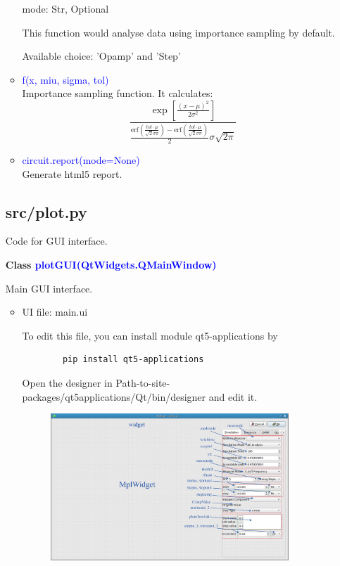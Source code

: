 \documentclass[12pt,a4paper]{article}
\begin{document}
\begin{itemize}[leftmargin=*]
\begin{itemize}
        mode: Str, Optional\par
        \quad This function would analyse data using importance sampling by default.

        \quad Available choice: 'Opamp' and 'Step'

    \item \textcolor{blue}{f(x, miu, sigma, tol)}\\
        Importance sampling function. It calculates:
        \begin{equation*}
            \frac{\exp\left [\frac{(x-\mu)^2}{2\sigma^2}\right ]}{\frac{\text{erf}(\frac{tol\cdot\mu}{\sqrt{2}\sigma\pi})-\text{erf}(\frac{tol\cdot\mu}{\sqrt{2}\sigma\pi})}{2}\sigma\sqrt{2\pi}}
        \end{equation*}

    \item \textcolor{blue}{circuit.report(mode=None)}\\
        Generate html5 report.
\end{itemize}

\subsection{src/plot.py}
Code for GUI interface.

\textbf{Class \textcolor{blue}{plotGUI(QtWidgets.QMainWindow)}}

Main GUI interface.

\begin{itemize}
    \item UI file: main.ui\par
        To edit this file, you can install module qt5-applications by
        \begin{lstlisting}
        pip install qt5-applications
        \end{lstlisting}

        Open the designer in Path-to-site-packages/qt5\textunderscore applications/Qt/bin/designer and edit it.
        \begin{figure}[ht]
            \centering
            \includegraphics[width=0.9\textwidth]{Image/config.eps}
            \caption{}
        \end{figure}



\end{itemize}
\end{itemize}
\end{document}
